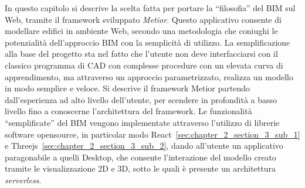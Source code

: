 In questo capitolo si descrive la scelta fatta per portare la ``filosofia'' del BIM sul Web, tramite il framework sviluppato
\emph{Metior}.
Questo applicativo consente di modellare edifici in ambiente Web, secondo una metodologia che coniughi le potenzialità
dell’approccio BIM con la semplicità di utilizzo.
La semplificazione alla base del progetto sta nel fatto che l'utente non deve interfacciarsi con il classico programma
di CAD con complesse procedure con un elevata curva di apprendimento, ma attraverso un approccio parametrizzato,
realizza un modello in modo semplice e veloce.
Si descrive il framework Metior partendo dall'esperienza ad alto livello dell'utente, per scendere in profondità
a basso livello fino a conoscerne l'architettura del framework.
Le funzionalità ``semplificate'' del BIM vengono implementate attraverso l'utilizzo di librerie software opensource,
in particolar modo React~\ref{sec:chapter_2_section_3_sub_1}
 e Threejs~\ref{sec:chapter_2_section_3_sub_2}, dando all'utente un applicativo paragonabile a quelli
Desktop, che consente l'interazione del modello creato tramite le visualizzazione 2D e 3D, sotto le quali
è presente un architettura \emph{serverless}.
\newpage
